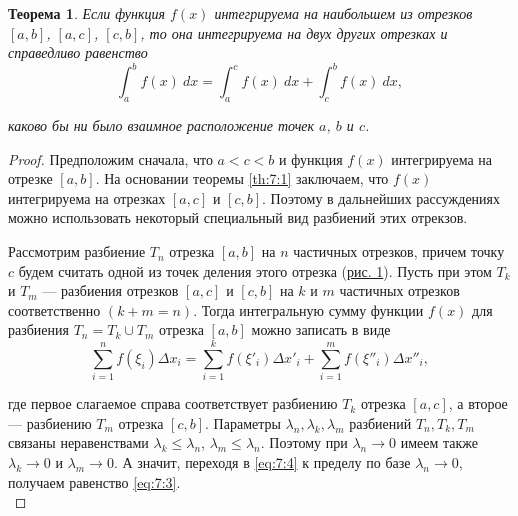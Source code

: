 \documentclass[12pt]{report}
\numberwithin{equation}{section}
\newtheorem{theorem}{Теорема}[section]
\begin{document}
\begin{theorem} \label{th:7:2}
Если функция $f(x)$ интегрируема на наибольшем из отрезков $[a,b]$, $[a,c]$, $[c,b]$, то она интегрируема на двух других отрезках и справедливо равенство
\begin{equation}\label{eq:7:3}
\int_a^b f(x)~dx = \int_a^c f(x) ~dx + \int_c^b f(x)~dx, 
\end{equation}

каково бы ни было взаимное расположение точек $a$, $b$ и $c$.
\end{theorem}
\begin{proof}
Предположим сначала, что $a < c < b$ и функция $f(x)$  интегрируема на отрезке $[a,b]$. На основании теоремы \ref{th:7:1} заключаем, что $f(x)$ интегрируема на отрезках $[a,c]$ и $[c,b]$. Поэтому в дальнейших рассуждениях можно использовать некоторый специальный вид разбиений этих отрекзов.

\begin{center}
\end{center}

Рассмотрим разбиение $T_n$ отрезка $[a,b]$ на $n$ частичных отрезков, причем точку $c$ будем считать одной из точек деления этого отрезка (\hyperref[pic:7:1]{рис. 1}). Пусть при этом $T_k$ и $T_m$ --- разбиения отрезков $[a,c]$ и $[c,b]$ на $k$ и $m$ частичных отрезков соответственно $(k + m = n)$. Тогда интегральную сумму функции $f(x)$ для разбиения $T_n = T_k \cup T_m$ отрезка $[a,b]$ можно записать в виде
\begin{equation} \label{eq:7:4}
\sum_{i=1}^n f(\xi_i) \Delta x_i = \sum_{i=1}^k f(\xi'_i) \Delta x'_i + \sum_{i=1}^m f(\xi''_i) \Delta x''_i,
\end{equation}

где первое слагаемое справа соответствует разбиению $T_k$ отрезка $[a,c]$, а второе --- разбиению $T_m$ отрезка $[c,b]$. Параметры $\lambda_n, \lambda_k, \lambda_m$ разбиений $T_n, T_k, T_m$ связаны неравенствами $\lambda_k \leqslant \lambda_n$, $\lambda_m \leqslant \lambda_n$. Поэтому при $\lambda_n \to 0$ имеем также $\lambda_k \to 0$ и $\lambda_m \to 0$. А значит, переходя в \eqref{eq:7:4} к пределу по базе $\lambda_n \to 0$, получаем равенство \eqref{eq:7:3}.\\


\end{proof}
\end{document}
